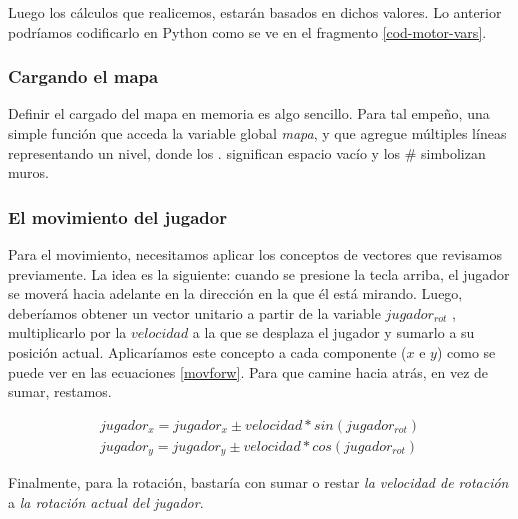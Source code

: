 Luego los cálculos que realicemos, estarán basados en dichos valores. Lo anterior podríamos codificarlo en Python como se ve en el fragmento \ref{cod-motor-vars}.

\newpage


\subsubsection{Cargando el mapa}

Definir el cargado del mapa en memoria es algo sencillo. Para tal empeño, una simple función que acceda la variable global \emph{mapa}, y que agregue múltiples líneas representando un nivel, donde los $.$ significan espacio vacío y los $\#$ simbolizan muros.




\subsubsection{El movimiento del jugador}

Para el movimiento, necesitamos aplicar los conceptos de vectores que revisamos previamente. La idea es la siguiente: cuando se presione la tecla arriba, el jugador se moverá hacia adelante en la dirección en la que él está mirando. Luego, deberíamos obtener un vector unitario a partir de la variable $jugador_{rot}$ , multiplicarlo por la $velocidad$ a la que se desplaza el jugador y sumarlo a su posición actual. Aplicaríamos este concepto a cada componente ($x$ e $y$) como se puede ver en las ecuaciones \ref{movforw}. Para que camine hacia atrás, en vez de sumar, restamos. 

\begin{equation}
\begin{aligned}
\label{movforw}
jugador_x = jugador_x \pm velocidad * sin(jugador_{rot})  \\
jugador_y = jugador_y \pm velocidad * cos(jugador_{rot})
\end{aligned}
\end{equation}

Finalmente, para la rotación, bastaría con sumar o restar \emph{la velocidad de rotación} a \emph{la rotación actual del jugador}.

